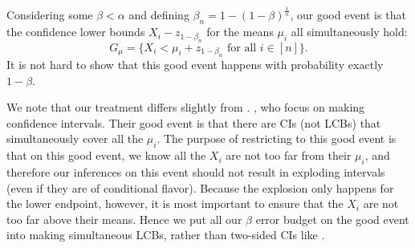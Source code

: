 \documentclass{article}
\begin{document}
\begin{appendix}
Considering some $\beta < \alpha$ and defining $\beta_n = 1 - (1-\beta)^{\frac{1}{n}}$, our good event is that the confidence lower bounds $X_i -  z_{1-\beta_n}$ for the means $\mu_i$ all simultaneously hold:
\begin{equation*}
    G_{\mu} = \{X_i < \mu_i + z_{1-\beta_n} \text{ for all } i \in [n] \}.
\end{equation*}
It is not hard to show that this good event happens with probability exactly $1-\beta$.

We note that our treatment differs slightly from \cite{Andrews2023}. \cite{Andrews2023}, who focus on making confidence intervals. Their good event is that there are CIs (not LCBs) that simultaneously cover all the $\mu_i$. The purpose of restricting to this good event is that on this good event, we know all the $X_i$ are not too far from their $\mu_i$, and therefore our inferences on this event should not result in exploding intervals (even if they are of conditional flavor). Because the explosion only happens for the lower endpoint, however, it is most important to ensure that the $X_i$ are not too far above their means. Hence we put all our $\beta$ error budget on the good event into making simultaneous LCBs, rather than two-sided CIs like \cite{Andrews2023}.  


\end{appendix}
\end{document}
